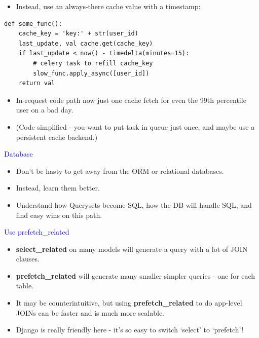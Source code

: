 \documentclass[landscape]{slides}
\begin{document}
\begin{slide}

    \begin{itemize}
        \item Instead, use an always-there cache value with a timestamp:
    \end{itemize}

    \begin{lstlisting}
def some_func():
    cache_key = 'key:' + str(user_id)
    last_update, val cache.get(cache_key)
    if last_update < now() - timedelta(minutes=15):
        # celery task to refill cache_key
        slow_func.apply_async([user_id])
    return val
    \end{lstlisting}

    \begin{itemize}
        \item In-request code path now just one cache fetch for even the 99th percentile user on a bad day.
        \item (Code simplified - you want to put task in queue just once, and maybe use a persistent cache backend.)
    \end{itemize}

\end{slide}


\begin{slide}

    \textcolor{blue}{\Large{Database}}

    \begin{itemize}
        \item Don't be hasty to get away from the ORM or relational databases.
        \item Instead, learn them better.
        \item Understand how Querysets become SQL, how the DB will handle SQL, and find easy wins on this path.
    \end{itemize}

\end{slide}


\begin{slide}

    \textcolor{blue}{\Large{Use prefetch\_related}}

    \begin{itemize}
        \item \textbf{select\_related} on many models will generate a query with a lot of JOIN clauses.
        \item \textbf{prefetch\_related} will generate many smaller simpler queries - one for each table.
        \item It may be counterintuitive, but using \textbf{prefetch\_related} to do app-level JOINs can be faster and is much more scalable.
        \item Django is really friendly here - it's so easy to switch `select' to `prefetch'!
    \end{itemize}

\end{slide}
\end{document}
